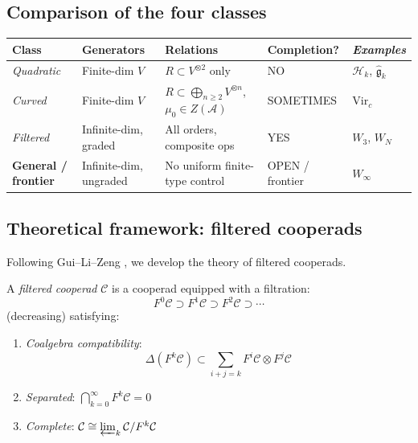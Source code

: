 \subsection{Comparison of the four classes}

\begin{center}
\renewcommand{\arraystretch}{1.5}
\begin{tabular}{|>{\raggedright\arraybackslash}p{2.5cm}|>{\raggedright\arraybackslash}p{2.5cm}|>{\raggedright\arraybackslash}p{2.5cm}|>{\raggedright\arraybackslash}p{2.5cm}|>{\raggedright\arraybackslash}p{3cm}|}
\hline
\textbf{Class} & \textbf{Generators} & \textbf{Relations} & \textbf{Completion?} & \emph{Examples} \\
\hline
\hline
\emph{Quadratic} & 
Finite-dim $V$ & 
$R \subset V^{\otimes 2}$ only & 
NO &
$\mathcal{H}_k$, $\widehat{\mathfrak{g}}_k$ \\
\hline
\emph{Curved} & 
Finite-dim $V$ & 
$R \subset \bigoplus_{n \geq 2} V^{\otimes n}$, $\mu_0 \in Z(\mathcal{A})$ & 
SOMETIMES &
$\text{Vir}_c$ \\
\hline
\emph{Filtered} & 
Infinite-dim, graded & 
All orders, composite ops & 
YES &
$W_3$, $W_N$ \\
\hline
\textbf{General / frontier} & 
Infinite-dim, ungraded & 
No uniform finite-type control & 
OPEN / frontier &
$W_\infty$ \\
\hline
\end{tabular}
\end{center}

\subsection{Theoretical framework: filtered cooperads}

Following Gui--Li--Zeng \cite{GLZ22}, we develop the theory of filtered cooperads.

\begin{definition}\label{def:filtered-cooperad}
A \emph{filtered cooperad} $\mathcal{C}$ is a cooperad equipped with a filtration:
\begin{equation}
F^0\mathcal{C} \supset F^1\mathcal{C} \supset F^2\mathcal{C} \supset \cdots
\end{equation}
(decreasing) satisfying:
\begin{enumerate}
\item \emph{Coalgebra compatibility}: 
\[\Delta(F^k\mathcal{C}) \subset \sum_{i+j=k} F^i\mathcal{C} \otimes F^j\mathcal{C}\]
\item \emph{Separated}: $\bigcap_{k=0}^\infty F^k\mathcal{C} = 0$
\item \emph{Complete}: $\mathcal{C} \cong \varprojlim_k \mathcal{C}/F^k\mathcal{C}$
\end{enumerate}
\end{definition}

